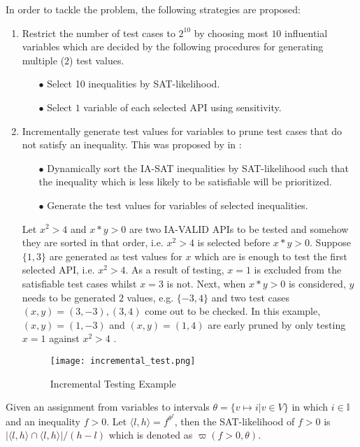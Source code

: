 In order to tackle the problem, the following strategies are proposed:
\begin{enumerate}
\item Restrict the number of test cases to $2^{10}$ by choosing most $10$ influential variables which are decided by the following procedures for generating multiple ($2$) test values.
\begin{itemize}
\item[$\bullet$] Select 10 inequalities by SAT-likelihood.
\item[$\bullet$] Select $1$ variable of each selected API using sensitivity.
\end{itemize}
\item Incrementally generate test values for variables to prune test cases that do not satisfy an inequality. This was proposed by \citeauthor{khanhReport} in \cite{khanhReport}:
\begin{itemize}
\item[$\bullet$] Dynamically sort the IA-SAT inequalities by SAT-likelihood such that the inequality which is less likely to be satisfiable will be prioritized.
\item[$\bullet$] Generate the test values for variables of selected inequalities.
\end{itemize}
\begin{example}
Let $x^2 > 4$ and $x*y > 0$ are two IA-VALID APIs to be tested and somehow they are sorted in that order, i.e. $x^2 > 4$ is selected before $x*y > 0$. Suppose $\{1, 3\}$ are generated as test values for $x$ which are is enough to test the first selected API, i.e. $x^2 > 4$. As a result of testing, $x = 1$ is excluded from the satisfiable test cases whilst $x = 3$ is not. Next, when $x*y > 0$ is considered, $y$ needs to be generated $2$ values, e.g. $\{-3, 4\}$ and two test cases $(x, y) = (3, -3), (3, 4)$ come out to be checked. In this example, $(x, y) = (1, -3)$ and  $(x, y) = (1, 4)$ are early pruned by only testing $x = 1$ against $x^2 > 4$ .
\end{example}
\begin{figure}[ht]
\centering
\texttt{[image: incremental\_test.png]} 
\caption{Incremental Testing Example} 
\label{fig:incremental-test} 
\end{figure} 
\end{enumerate}

\begin{definition}
Given an assignment from variables to intervals $\theta = \{v \mapsto i | v \in V\}$ in which $i \in \mathbb{I}$ and an inequality $f > 0$. Let $\langle l, h \rangle = f^{\theta^I}$, then the SAT-likelihood of $f > 0$ is $|\langle l, h \rangle \cap \langle l, h \rangle| / (h - l)$ which is denoted as $\varpi(f>0, \theta)$.
\end{definition}

